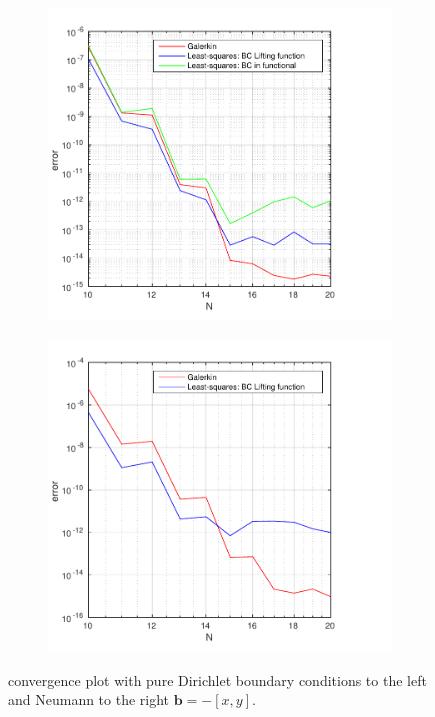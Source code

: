 %
%
\begin{figure}[h!]
  \centering
  \begin{subfigure}[b]{0.48\textwidth}
		\includegraphics[width=\textwidth]{Figures/Spec_difftrans_Convergence.pdf}
  \end{subfigure}%
  \quad
  \begin{subfigure}[b]{0.48\textwidth}
		\includegraphics[width=\textwidth]{Figures/Spec_difftrans_Convergence_Neu.pdf}
  \end{subfigure}
  \vspace{-0.1\baselineskip}
	\caption{convergence plot with pure Dirichlet boundary conditions to the left and Neumann to the right  $\mathbf{b} = -[x,y]$.}
  \label{fig:ConvergenceDifftransSpec}
\end{figure}
%

